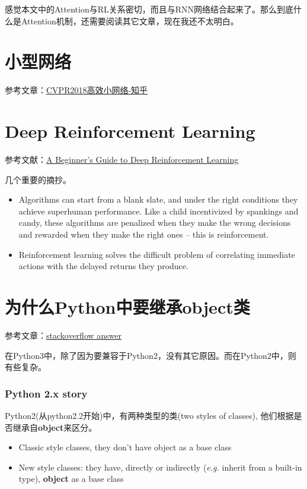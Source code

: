感觉本文中的Attention与RL关系密切，而且与RNN网络结合起来了。那么到底什么是Attention机制，还需要阅读其它文章，现在我还不太明白。


\section{小型网络}

参考文章：\href{https://zhuanlan.zhihu.com/p/37074222}{CVPR2018高效小网络-知乎}

\section{Deep Reinforcement Learning}

参考文献：\href{https://deeplearning4j.org/deepreinforcementlearning}{A Beginner's Guide to Deep Reinforcement Learning}

几个重要的摘抄。
\begin{itemize}
\item Algorithms can start from a blank slate, and under the right conditions they achieve superhuman performance. Like a child incentivized by spankings and candy, these algorithms are penalized when they make the wrong decisions and rewarded when they make the right ones – this is reinforcement.

\item Reinforcement learning solves the difficult problem of correlating immediate actions with the delayed returns they produce. 
\end{itemize}

\section{为什么Python中要继承object类}

参考文章：\href{https://stackoverflow.com/questions/4015417/python-class-inherits-object}{stackoverflow answer}

在Python3中，除了因为要兼容于Python2，没有其它原因。而在Python2中，则有些复杂。

\subsubsection{Python 2.x story}
Python2(从python2.2开始)中，有两种类型的类(two styles of classes), 他们根据是否继承自\textbf{object}来区分。

\begin{itemize}
\item Classic style classes, they don't have object as a base class
\item New style classes: they have, directly or indirectly (\textit{e.g.} inherit from a built-in type), \textbf{object} as a base class
\end{itemize}

